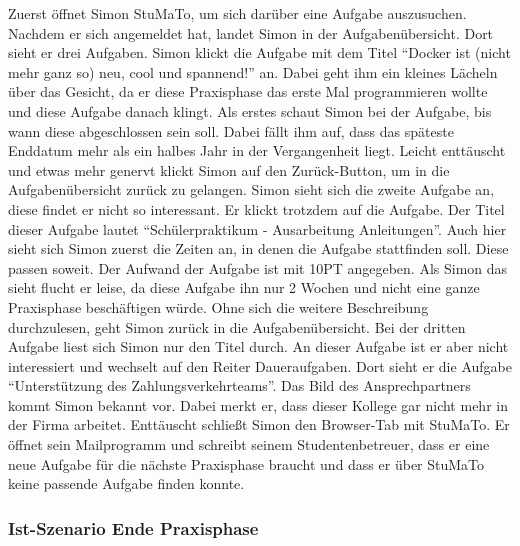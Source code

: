 \documentclass[
  12pt,
  ngerman,
  a4paper,
]{article}
\begin{document}
Zuerst öffnet Simon StuMaTo, um sich darüber eine Aufgabe auszusuchen.
Nachdem er sich angemeldet hat, landet Simon in der Aufgabenübersicht.
Dort sieht er drei Aufgaben. Simon klickt die Aufgabe mit dem Titel
``Docker ist (nicht mehr ganz so) neu, cool und spannend!'' an. Dabei
geht ihm ein kleines Lächeln über das Gesicht, da er diese Praxisphase
das erste Mal programmieren wollte und diese Aufgabe danach klingt. Als
erstes schaut Simon bei der Aufgabe, bis wann diese abgeschlossen sein
soll. Dabei fällt ihm auf, dass das späteste Enddatum mehr als ein
halbes Jahr in der Vergangenheit liegt. Leicht enttäuscht und etwas mehr
genervt klickt Simon auf den Zurück-Button, um in die Aufgabenübersicht
zurück zu gelangen. Simon sieht sich die zweite Aufgabe an, diese findet
er nicht so interessant. Er klickt trotzdem auf die Aufgabe. Der Titel
dieser Aufgabe lautet ``Schülerpraktikum - Ausarbeitung Anleitungen''.
Auch hier sieht sich Simon zuerst die Zeiten an, in denen die Aufgabe
stattfinden soll. Diese passen soweit. Der Aufwand der Aufgabe ist mit
10PT angegeben. Als Simon das sieht flucht er leise, da diese Aufgabe
ihn nur 2 Wochen und nicht eine ganze Praxisphase beschäftigen würde.
Ohne sich die weitere Beschreibung durchzulesen, geht Simon zurück in
die Aufgabenübersicht. Bei der dritten Aufgabe liest sich Simon nur den
Titel durch. An dieser Aufgabe ist er aber nicht interessiert und
wechselt auf den Reiter Daueraufgaben. Dort sieht er die Aufgabe
``Unterstützung des Zahlungsverkehrteams''. Das Bild des
Ansprechpartners kommt Simon bekannt vor. Dabei merkt er, dass dieser
Kollege gar nicht mehr in der Firma arbeitet. Enttäuscht schließt Simon
den Browser-Tab mit StuMaTo. Er öffnet sein Mailprogramm und schreibt
seinem Studentenbetreuer, dass er eine neue Aufgabe für die nächste
Praxisphase braucht und dass er über StuMaTo keine passende Aufgabe
finden konnte.

\hypertarget{ist-szenario-ende-praxisphase}{%
\subsubsection{Ist-Szenario Ende
Praxisphase}\label{ist-szenario-ende-praxisphase}}
\end{document}
